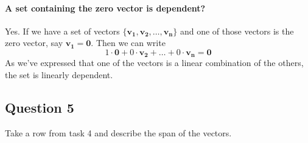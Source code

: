 \documentclass{article}
\begin{document}
            \paragraph{A set containing the zero vector is dependent?}
                Yes. If we have a set of vectors $\{\mathbf{v_1}, \mathbf{v_2}, \ldots, \mathbf{v_n}\}$
                and one of those vectors is the zero vector, say $\mathbf{v_1} = \mathbf{0}$.
                Then we can write
                \[
                1\cdot\mathbf{0} + 0\cdot\mathbf{v_2} + \ldots + 0\cdot\mathbf{v_n} = \mathbf{0}
                \]
                As we've expressed that one of the vectors is a linear combination
                of the others, the set is linearly dependent.
    \subsection{Question 5}
        Take a row from task 4 and describe the span of the vectors.
\end{document}
